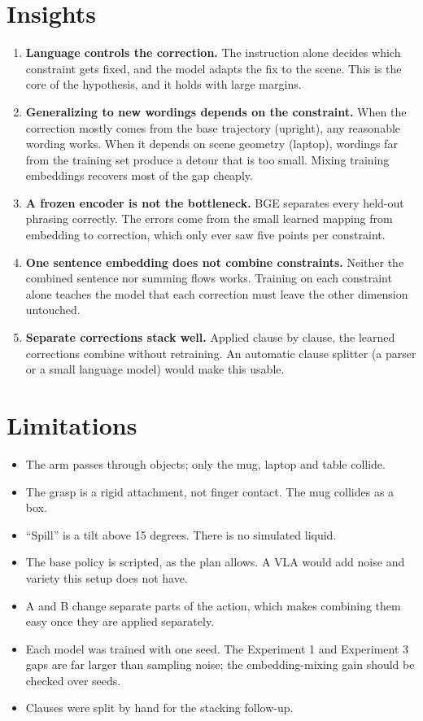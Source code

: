 \documentclass[11pt]{article}
\begin{document}
\section{Insights}

\begin{enumerate}
  \item \textbf{Language controls the correction.} The instruction alone decides which
        constraint gets fixed, and the model adapts the fix to the scene. This is the core of the
        hypothesis, and it holds with large margins.
  \item \textbf{Generalizing to new wordings depends on the constraint.} When the correction
        mostly comes from the base trajectory (upright), any reasonable wording works. When it
        depends on scene geometry (laptop), wordings far from the training set produce a
        detour that is too small. Mixing training embeddings recovers most of the gap cheaply.
  \item \textbf{A frozen encoder is not the bottleneck.} BGE separates every held-out phrasing
        correctly. The errors come from the small learned mapping from embedding to correction,
        which only ever saw five points per constraint.
  \item \textbf{One sentence embedding does not combine constraints.} Neither the combined
        sentence nor summing flows works. Training on each constraint alone teaches the model
        that each correction must leave the other dimension untouched.
  \item \textbf{Separate corrections stack well.} Applied clause by clause, the learned
        corrections combine without retraining. An automatic clause splitter (a parser or a
        small language model) would make this usable.
\end{enumerate}

\section{Limitations}

\begin{itemize}
  \item The arm passes through objects; only the mug, laptop and table collide.
  \item The grasp is a rigid attachment, not finger contact. The mug collides as a box.
  \item ``Spill'' is a tilt above 15 degrees. There is no simulated liquid.
  \item The base policy is scripted, as the plan allows. A VLA would add noise and variety this
        setup does not have.
  \item A and B change separate parts of the action, which makes combining them easy once they
        are applied separately.
  \item Each model was trained with one seed. The Experiment 1 and Experiment 3 gaps are far
        larger than sampling noise; the embedding-mixing gain should be checked over seeds.
  \item Clauses were split by hand for the stacking follow-up.
\end{itemize}
\end{document}
